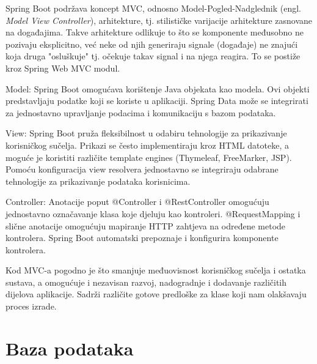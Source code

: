  Spring Boot podržava koncept MVC, odnosno Model-Pogled-Nadglednik
(engl. \textit{Model View Controller}), arhitekture, tj. stilističke varijacije arhitekture zasnovane 
na događajima. Takve arhitekture odlikuje to što se komponente međusobno ne pozivaju
eksplicitno, već neke od njih generiraju signale (događaje) ne znajući koja druga
"osluškuje" tj. očekuje takav signal i na njega reagira. To se postiže kroz Spring Web MVC modul. 
\begin{packed_item}
	\item Model: Spring Boot omogućava korištenje Java objekata kao modela. Ovi objekti predstavljaju podatke koji se koriste u aplikaciji.
	Spring Data može se integrirati za jednostavno upravljanje podacima i komunikaciju s bazom podataka.
	\item View: Spring Boot pruža fleksibilnost u odabiru tehnologije za prikazivanje korisničkog sučelja. Prikazi se često implementiraju kroz HTML datoteke, a moguće je koristiti različite template engines (Thymeleaf, FreeMarker, JSP).
	Pomoću konfiguracija view resolvera jednostavno se integriraju odabrane tehnologije za prikazivanje podataka korisnicima.
	\item Controller: Anotacije poput @Controller i @RestController omogućuju jednostavno označavanje klasa koje djeluju kao kontroleri.
	@RequestMapping i slične anotacije omogućuju mapiranje HTTP zahtjeva na određene metode kontrolera.
	Spring Boot automatski prepoznaje i konfigurira komponente kontrolera.		
\end{packed_item}

Kod MVC-a pogodno je što smanjuje međuovisnost korisničkog sučelja i ostatka sustava, a omogućuje i nezavisan razvoj, nadogradnje i dodavanje različitih dijelova aplikacije. Sadrži različite
gotove predloške za klase koji nam olakšavaju proces izrade.
				
		\section{Baza podataka}
			    


